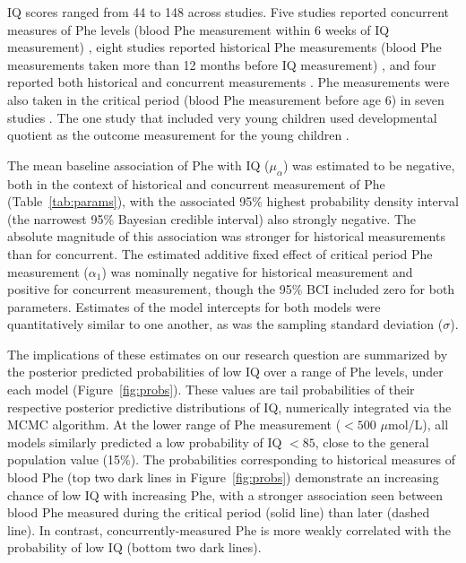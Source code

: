\documentclass{svjour3}                     %
\begin{document}
IQ scores ranged from 44 to 148 across studies. Five studies reported concurrent measures of Phe levels (blood Phe measurement within 6 weeks of IQ measurement) \citep{Azadi:2009ha, Cerone:1999vf, Jones:1995vw, Ris:1997vv, Schmidt:1994wx}, eight studies reported historical Phe measurements (blood Phe measurements taken more than 12 months before IQ measurement) \citep{Griffiths:2000ti, Leuzzi:1998um, Pfaendner:2005uo, Seashore:1985wf, Weglage:2001us, Weglage:2000wf, Weglage:1999tr}, and four reported both historical and concurrent measurements \citep{Anastasoaie:2008hv, Rupp:2001jg, WASSERSTEIN:2006bv, Viau:2011he}. Phe measurements were also taken in the critical period (blood Phe measurement before age 6) in seven studies \citep{Anastasoaie:2008hv, Griffiths:2000ti, Pfaendner:2005uo, Seashore:1985wf, WASSERSTEIN:2006bv, Welsh:1990uw, Viau:2011he}. The one study that included very young children used developmental quotient as the outcome measurement for the young children \citep{Anastasoaie:2008hv}.

The mean baseline association of Phe with IQ ($\mu_{\alpha}$) was estimated to be negative, both in the context of historical and concurrent measurement of Phe (Table~\ref{tab:params}), with the associated 95\% highest probability density interval (the narrowest 95\% Bayesian credible interval) also strongly negative. The absolute magnitude of this association was stronger for historical measurements than for concurrent. The estimated additive fixed effect of critical period Phe measurement ($\alpha_1$) was nominally negative for historical measurement and positive for concurrent measurement, though the 95\% BCI included zero for both parameters. Estimates of the model intercepts for both models were quantitatively similar to one another, as was the sampling standard deviation ($\sigma$).

The implications of these estimates on our research question are summarized by the posterior predicted probabilities of low IQ over a range of Phe levels, under each model (Figure~\ref{fig:probs}). These values are tail probabilities of their respective posterior predictive distributions of IQ, numerically integrated via the MCMC algorithm. At the lower range of Phe measurement ($<500$ $\mu$mol/L), all models similarly predicted a low probability of IQ $<85$, close to the general population value (15\%). The probabilities corresponding to historical measures of blood Phe (top two dark lines in Figure~\ref{fig:probs}) demonstrate an increasing chance of low IQ with increasing Phe, with a stronger association seen between blood Phe measured during the critical period (solid line) than later (dashed line). In contrast, concurrently-measured Phe is more weakly correlated with the probability of low IQ (bottom two dark lines).
\end{document}
